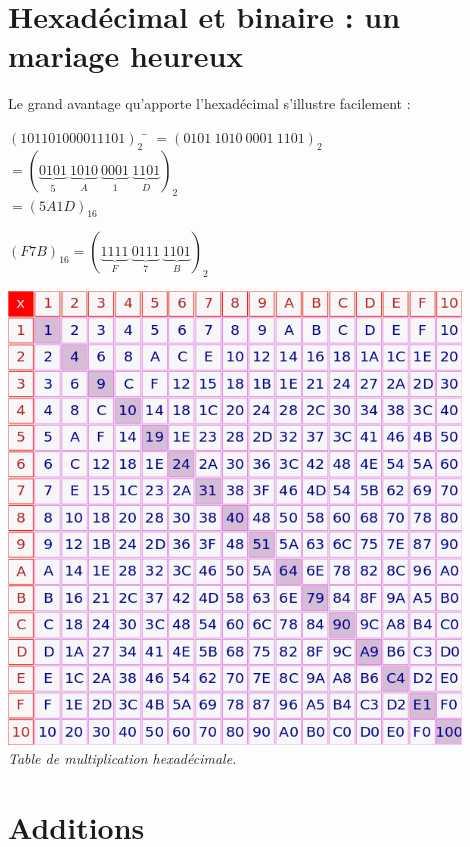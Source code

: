 \documentclass[a4paper,12pt,french]{book}
\begin{document}
\section{Hexadécimal et binaire : un mariage heureux}
Le grand avantage qu'apporte l'hexadécimal s'illustre facilement :

\begin{methode}
\begin{tabbing}
	$(101101000011101)_2$	\=	$=(0101\ 1010\ 0001\ 1101)_2$\\
				\>	$=\left(\underbrace{0101}_5\ \underbrace{1010}_A\ \underbrace{0001}_1\ \underbrace{1101}_D\right)_2$\\
				\>	$=(5A1D)_{16}$
\end{tabbing}
\end{methode}

\begin{methode}
$(F7B)_{16}=\left(\underbrace{1111}_F\ \underbrace{0111}_7\ \underbrace{1101}_B\right)_2$
\end{methode}
\begin{center}
\includegraphics[width=12cm]{hexmult.png}\\
\textit{Table de multiplication hexadécimale.}
\end{center}


\section{Additions}
\end{document}
